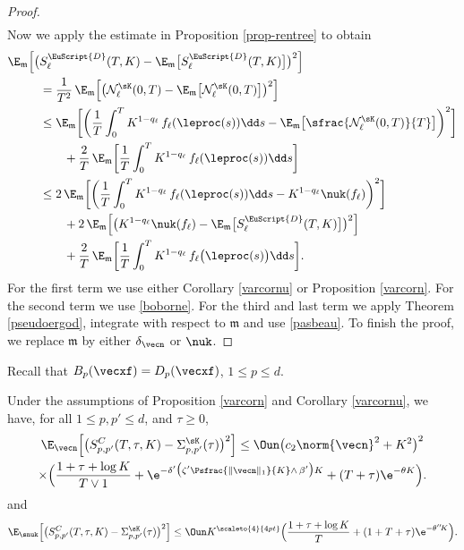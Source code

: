 \begin{proof}
\begin{multline}
\end{multline}
Now we apply the estimate in Proposition \ref{prop-rentree} to obtain
\begin{align*}
\E_{\mathfrak{m}} \Bigl[\bigl(&S^{{\EuScript{D}}}_{\ell}(T,K) -\E_{\mathfrak{m}}\bigl[S^{\EuScript{D}}_{\ell}(T,K)\bigr]\bigr)^2\Bigr]\\
& =\frac{1}{T^2} \, \E_{\mathfrak{m}} \Bigl[\bigl(\mathcal{N}^{\sK}_\ell(0,T) -
\E_{\mathfrak{m}}\bigl[\mathcal{N}^{\sK}_\ell(0,T)\bigr]\bigr)^2\Bigr]\\
& \leq \E_{\mathfrak{m}} \biggl[\biggl(
\frac{1}{T} \int_0^T K^{1-q_\ell}\, f_\ell(\leproc(s)) \dd s -\E_{\mathfrak{m}}\bigl[\sfrac{\mathcal{N}^{\sK}_\ell(0,T)}{T}\bigr]
\biggr)^2\biggr]\\
& \qquad + \frac{2}{T} \, \E_{\mathfrak{m}}\biggl[
\frac{1}{T} \int_0^T K^{1-q_\ell} \, f_\ell(\leproc(s)) \dd s
\biggr] \\
& \leq 2\,\E_{\mathfrak{m}}\biggl[\biggl(
\frac{1}{T} \int_0^T K^{1-q_\ell}\, f_\ell(\leproc(s)) \dd s - K^{1-q_\ell} \nuk(f_\ell)
\biggr)^2\biggr] \\
& \qquad + 2\,\E_{\mathfrak{m}}\Bigl[\bigl(K^{1-q_\ell} \nuk(f_\ell)-\E_{\mathfrak{m}}\bigl[S^{\EuScript{D}}_{\ell}(T,K)\bigr]
\bigr)^2\Bigr]\\
& \qquad + \frac{2}{T} \, \E_{\mathfrak{m}}\biggl[\frac{1}{T} \int_0^T K^{1-q_\ell} \, f_\ell\bigl(\leproc(s)\bigr) \dd s
\biggr].
\end{align*}
For the first term we use either Corollary \ref{varcornu} or Proposition \ref{varcorn}. For the second term we use
\eqref{boborne}. For the third and last term we apply Theorem \ref{pseudoergod}, integrate with respect to $\mathfrak{m}$ and use
\eqref{pasbeau}. To finish the proof, we replace $\mathfrak{m}$ by either $\delta_{\vecn}$ or $\nuk$.
\end{proof}

Recall that $B_{p}(\vecxf)=D_{p}(\vecxf)$, $1\leq p\leq d$.
\begin{proposition}
\label{vs4}
Under the assumptions of Proposition \ref{varcorn} and Corollary \ref{varcornu}, we have, for all $1\leq p,p'\leq d$, and $\tau\geq 0$,
\begin{multline*}
\E_{\vecn}\Bigl[\bigl(S^{C}_{p,p'}(T,\tau,K)-\Sigma^{\sK}_{p,p'}(\tau)\bigr)^2\Bigr]
\leq \Oun \bigl(c_2\norm{\vecn}^{2} +K^2\bigr)^2\\
\times \Bigl(\frac{1+\tau+\log K}{T\vee 1}+ \e^{-\delta'\bigl(\zeta' \Psfrac{\|\vecn\|_{1}}{K}\wedge\, \beta'\bigr)K}
+(T+\tau) \e^{-\theta K}
\Bigr).
\end{multline*}
and
\[
\E_{\snuk}\Bigl[\bigl(S^{C}_{p,p'}(T,\tau,K)-\Sigma^{\sK}_{p,p'}(\tau)\bigr)^2\Bigr]
\leq \Oun K^{\scaleto{4}{4pt}} \Bigl(\frac{1+\tau+\log K}{T}+ (1+T+\tau)\e^{-\theta''\! K} \Bigr).
\]
\end{proposition}

